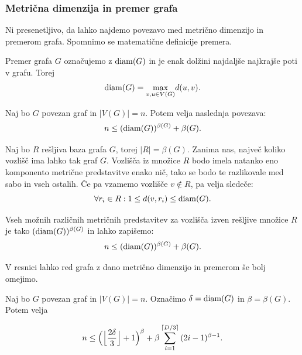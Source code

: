 \documentclass[mat1, tisk]{fmfdelo}
\begin{document}

\subsubsection{Metrična dimenzija in premer grafa}

Ni presenetljivo, da lahko najdemo povezavo med metrično dimenzijo in premerom grafa.
Spomnimo se matematične definicije premera.

\begin{definicija}
    Premer grafa $G$ označujemo z ${\rm diam}(G)$ in je enak dolžini najdaljše najkrajše poti v grafu.
    Torej $${\rm diam}(G) = \underset{v, u \in V(G)}{\max} d(u, v).$${{}}
\end{definicija}

\begin{trditev}
    Naj bo $G$ povezan graf in $|V(G)| = n$. Potem velja naslednja povezava:
    $$n \leq ({\rm diam}(G))^{\beta (G)} + \beta (G). $$
\end{trditev}

\begin{dokaz}
    Naj bo $R$ rešljiva baza grafa $G$, torej $|R| = \beta(G).$ Zanima nas, največ koliko vozlišč
    ima lahko tak graf $G$. Vozlišča iz množice $R$ bodo imela natanko eno komponento metrične predstavitve
    enako nič, tako se bodo te razlikovale med sabo in vseh ostalih. 
    Če pa vzamemo vozlišče $v \notin R$, pa velja sledeče:
    $$\forall r_i \in R: 1 \leq d(v, r_i) \leq {\rm diam}(G).$$
    
    Vseh možnih različnih metričnih predstavitev za vozlišča izven rešljive množice $R$ 
    je tako $({\rm diam}(G))^{\beta (G)}$
    in lahko zapišemo:
    $$n \leq ({\rm diam}(G))^{\beta (G)} + \beta (G).$$
\end{dokaz}

V resnici lahko red grafa z dano metrično dimenzijo in premerom še bolj omejimo.

\begin{trditev}
    Naj bo $G$ povezan graf in $|V(G)| = n$. Označimo $ \delta = {\rm diam}(G)$ in $\beta = \beta (G)$. 
    Potem velja

    $$n \leq \Bigl ( \Bigl \lfloor {\frac{2 \delta}{3}}\Bigr \rfloor + 1 \Bigr )^{\beta} + 
    \beta \sum_{i = 1}^{\lceil D/3 \rceil} {(2i - 1)^{\beta - 1}}. $$
\end{trditev}

\begin{dokaz}
    
\end{dokaz}
\end{document}
